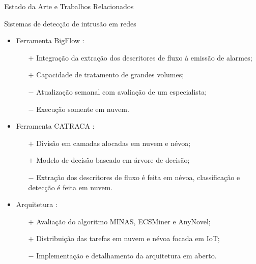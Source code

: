 \documentclass[aspectratio=1610,10pt]{beamer}
\begin{document}
\begin{frame}[fragile]{Estado da Arte e Trabalhos Relacionados}
\begin{alertblock}{Sistemas de detecção de intrusão em redes}
  \begin{itemize}%
    \item Ferramenta BigFlow \cite{Viegas2019}:
    \begin{itemize}
      \item[$\boldsymbol{+}$] Integração da extração dos descritores de fluxo à emissão de alarmes;
      \item[$\boldsymbol{+}$] Capacidade de tratamento de grandes volumes;
      \item[$\boldsymbol{-}$] Atualização semanal com avaliação de um especialista;
      \item[$\boldsymbol{-}$] Execução somente em nuvem.
    \end{itemize}
    \item Ferramenta CATRACA \cite{Lopez2018,Sanz2018}:
    \begin{itemize}
      \item[$\boldsymbol{+}$] Divisão em camadas alocadas em nuvem e névoa;
      \item[$\boldsymbol{+}$] Modelo de decisão baseado em árvore de decisão;
      \item[$\boldsymbol{-}$] Extração dos descritores de fluxo é feita em
      névoa, classificação e detecção é feita em nuvem.
    \end{itemize}
    \item Arquitetura \arch \cite{Cassales2019a}:
    \begin{itemize}
      \item[$+$] Avaliação do algoritmo MINAS, ECSMiner e AnyNovel;
      \item[$+$] Distribuição das tarefas em nuvem e névoa focada em IoT;
      \item[$-$] Implementação e detalhamento da arquitetura em aberto.
    \end{itemize}
  \end{itemize}
\end{alertblock}
\end{frame}
\end{document}
